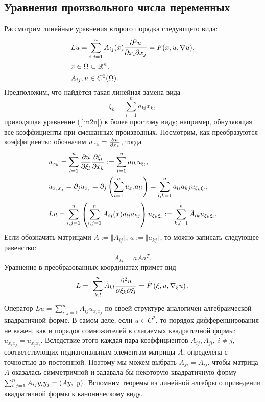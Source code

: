 \newpage
\subsection{Уравнения произвольного числа переменных}
    Рассмотрим линейные уравнения второго порядка следующего вида:
    \begin{align}
        & Lu = \sum_{i,j = 1}^n A_{ij}(x)\frac{\partial^2u}{\partial x_i\partial x_j} = F(x, u, \nabla u), \label{lin2n} \\ \notag
        & x \in \Omega \subset \mathbb{R}^n,\\ \notag
        & A_{ij}, u \in C^2(\Omega).
    \end{align}
    Предположим, что найдётся такая линейная замена вида
    \begin{equation}
        \xi_k = \sum_{i = 1}^n a_{ki} x_k, \label{lin_transform}
    \end{equation}
    приводящая уравнение (\ref{lin2n}) к более простому виду; например, обнуляющая все коэффициенты при смешанных производных.
    Посмотрим, как преобразуются коэффициенты: обозначим $u_{x_k} = \frac{\partial u}{\partial x_k}$, тогда
    \begin{align*}
        & u_{x_k} = \sum_{l = 1}^n \frac{\partial u}{\partial\xi_l} \frac{\partial\xi_l}{\partial x_k} := \sum_{l = 1}^n a_{lk}u_{\xi_l},\\
        & u_{x_i x_j} = \partial_j u_{x_i} = \partial_j \left({\sum_{l = 1}^n u_{x_l}a_{li}}\right) = \sum_{l,k = 1}^n a_{li} a_{kj} u_{\xi_k \xi_l},\\
        & Lu = \sum_{i, j = 1}^n \left({\sum_{i,j = 1}^n A_{ij}(x) a_{li} a_{kj}}\right) u_{\xi_k \xi_l} := \sum_{k, l = 1}^n\tilde{A}_{lk} u_{\xi_k \xi_l}.
    \end{align*}
    Если обозначить матрицами $A := \Vert A_{ij} \Vert$, $a := \Vert a_{kj} \Vert$, то можно записать следующее равенство:
    \begin{equation*}
        \tilde{A}_{kl} = a A a^T.
    \end{equation*}
    Уравнение в преобразованных координатах примет вид
    \begin{equation*}
        L= \ \sum_{k, l}^n \tilde{A}_{kl} \frac{\partial^2u}{\partial\xi_k\partial\xi_l} = \tilde{F}\left({\xi, u, \nabla_{\xi} u}\right).
    \end{equation*}
    Оператор $Lu = \sum_{i,j = 1}^n A_{ij}u_{x_i x_j}$ по своей структуре аналогичен алгебраической квадратичной форме. В самом деле, если $u \in C^2$,
    то порядок дифференцирования не важен, как и порядок сомножителей в слагаемых квадратичной формы: $u_{x_i x_j} = u_{x_j x_i}$. Вследствие этого каждая
    пара коэффициентов $A_{ij}, A_{ji},\: i \not= j$, соответствующих недиагональным элементам матрицы $A$, определена с точностью до постоянной.
    Поэтому мы можем выбрать $A_{ji} = A_{ij}$, чтобы матрица $A$ оказалась симметричной и задавала бы некоторую квадратичную форму
    $\sum_{i, j = 1}^n A_{ij} y_i y_j = \brackets{Ay,\ y}$. Вспомним теоремы из линейной алгебры о приведении квадратичной формы к каноническому виду.

